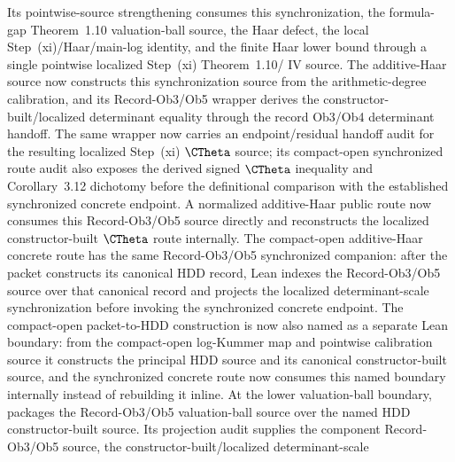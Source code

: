 \begin{proposition}
  Its pointwise-source strengthening
  consumes this synchronization, the formula-gap Theorem~1.10 valuation-ball
  source, the Haar defect, the local Step~(xi)/Haar/main-log identity, and the
  finite Haar lower bound through a single pointwise localized Step~(xi)
  Theorem~1.10/\IUT{} IV source.
  The additive-Haar source now constructs this synchronization source from the
  arithmetic-degree calibration, and its Record-Ob3/Ob5 wrapper derives the
  constructor-built/localized determinant equality through the record Ob3/Ob4
  determinant handoff.  The same wrapper now carries an endpoint/residual
  handoff audit for the resulting localized Step~(xi) \(\CTheta\) source; its
  compact-open synchronized route audit also exposes the derived signed
  \(\CTheta\) inequality and Corollary~3.12 dichotomy before the definitional
  comparison with the established synchronized concrete endpoint.
  A normalized additive-Haar public route now consumes this Record-Ob3/Ob5
  source directly and reconstructs the localized constructor-built
  \(\CTheta\) route internally.  The compact-open additive-Haar concrete route
  has the same Record-Ob3/Ob5 synchronized companion:
  after the packet constructs its canonical HDD record, Lean indexes the
  Record-Ob3/Ob5 source over that canonical record and projects the localized
  determinant-scale synchronization before invoking the synchronized
  concrete endpoint.  The compact-open packet-to-HDD construction is now also
  named as a separate Lean boundary: from the compact-open log-Kummer map and
  pointwise calibration source it constructs the principal HDD source and its
  canonical constructor-built source, and the synchronized concrete route now
  consumes this named boundary internally instead of rebuilding it inline.  At
  the lower valuation-ball boundary,
  packages the Record-Ob3/Ob5 valuation-ball source over the named HDD
  constructor-built source.  Its projection audit supplies the component
  Record-Ob3/Ob5 source, the constructor-built/localized determinant-scale

\end{proposition}
